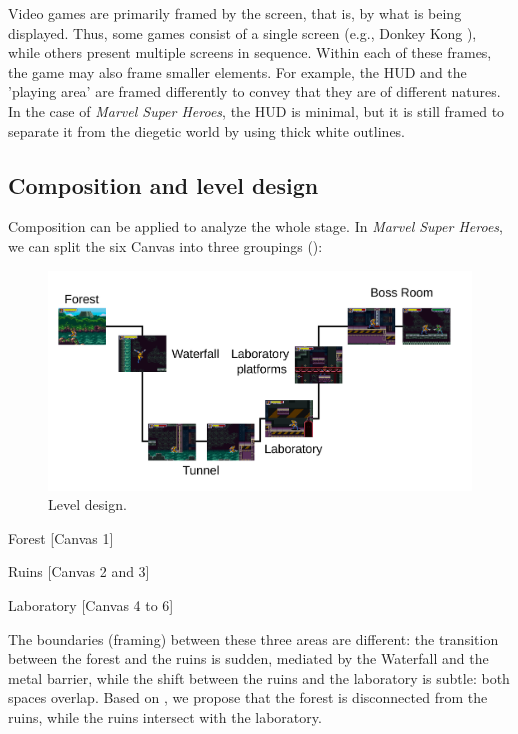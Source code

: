 \documentclass[english]{textolivre}
\begin{document}
Video games are primarily framed by the screen, that is, by what is being displayed. Thus, some games consist of a single screen (e.g., Donkey Kong \cite{nintendo_donkey_1981}), while others present multiple screens in sequence. Within each of these frames, the game may also frame smaller elements. For example, the HUD and the 'playing area' are framed differently to convey that they are of different natures. In the case of \textit{Marvel Super Heroes}, the HUD is minimal, but it is still framed to separate it from the diegetic world by using thick white outlines.

\subsection{Composition and level design}\label{sec-outras-estr}
Composition can be applied to analyze the whole stage. In \textit{Marvel Super Heroes}, we can split the six Canvas into three groupings ():

\begin{figure}[htbp]
 \centering
 \includegraphics[width=\textwidth]{fig-014.png}
 \caption{Level design.}
 \label{fig14}
\end{figure}

Forest [Canvas 1]

Ruins [Canvas 2 and 3]

Laboratory [Canvas 4 to 6]

The boundaries (framing) between these three areas are different: the transition between the forest and the ruins is sudden, mediated by the Waterfall and the metal barrier, while the shift between the ruins and the laboratory is subtle: both spaces overlap. Based on \textcite[p.~13]{van_leeuwen_introducing_2005}, we propose that the forest is disconnected from the ruins, while the ruins intersect with the laboratory.
\end{document}
